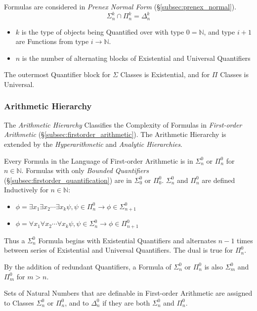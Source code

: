 \documentclass{article}
\begin{document}
Formulas are considered in \emph{Prenex Normal Form}
(\S\ref{subsec:prenex_normal}).
\[
    \Sigma^k_n \cap \Pi^k_n = \Delta^k_n
\]
\begin{itemize}
    \item $k$ is the type of objects being Quantified over with type
      $0 = \mathbb{N}$, and type $i + 1$ are Functions from type $i
      \rightarrow \mathbb{N}$.
    \item $n$ is the number of alternating blocks of Existential and
      Universal Quantifiers
\end{itemize}
The outermost Quantifier block for $\Sigma$ Classes is Existential,
and for $\Pi$ Classes is Universal.



\subsubsection{Arithmetic Hierarchy}\label{subsec:arithmetic_hierarchy}

The \emph{Arithmetic Hierarchy} Classifies the Complexity of Formulas
in \emph{First-order Arithmetic}
(\S\ref{subsec:firstorder_arithmetic}). The Arithmetic Hierarchy is
extended by the \emph{Hyperarithmetic} and \emph{Analytic
  Hierarchies}.

Every Formula in the Language of First-order Arithmetic is in
$\Sigma^0_n$ or $\Pi^0_n$ for $n \in \mathbb{N}$. Formulas with only
\emph{Bounded Quantifiers} (\S\ref{subsec:firstorder_quantification})
are in $\Sigma^0_0$ or $\Pi^0_0$. $\Sigma^0_n$ and $\Pi^0_n$ are
defined Inductively for $n \in \mathbb{N}$:

\begin{itemize}
    \item $\phi = \exists x_1 \exists x_2 \cdots \exists x_k\psi, \psi
      \in \Pi^0_n \rightarrow \phi \in \Sigma^0_{n+1}$
    \item $\phi = \forall x_1 \forall x_2 \cdots \forall x_k\psi, \psi
      \in \Sigma^0_n \rightarrow \phi \in \Pi^0_{n+1}$
\end{itemize}

Thus a $\Sigma^0_n$ Formula begins with Existential Quantifiers and
alternates $n-1$ times between series of Existential and Universal
Quantifiers. The dual is true for $\Pi^0_n$.

By the addition of redundant Quantifiers, a Formula of $\Sigma^0_n$ or
$\Pi^0_n$ is also $\Sigma^0_m$ and $\Pi^0_m$ for $m > n$.

Sets of Natural Numbers that are definable in First-order Arithmetic
are assigned to Classes $\Sigma^0_n$ or $\Pi^0_n$, and to $\Delta^0_n$
if they are both $\Sigma^0_n$ and $\Pi^0_n$.
\end{document}
